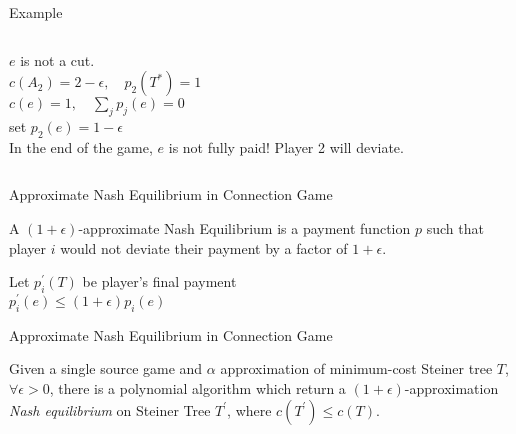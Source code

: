 \documentclass[11pt,aspectratio=169]{beamer}
\begin{document}
\begin{frame}{Example}
\begin{columns}
    \centering
\doublespacing
$e$ is not a cut.\\
$c(A_2) = 2-\epsilon,\quad p_2(T^*) =1$\\
$c(e) = 1,\quad \sum_{j}p_j(e) = 0 $\\
set $p_2(e) = 1 - \epsilon$ \\
In the end of the game, $e$ is not fully paid! Player 2 will deviate.
\end{columns}
\end{frame}

\begin{frame}{Approximate Nash Equilibrium in Connection Game}
    \begin{definition}
	    A \((1+\epsilon)\)-approximate Nash Equilibrium is a payment function \(p\) such that player \(i\) would not deviate their payment by a factor of \(1+\epsilon\).
    \end{definition}
    Let $ p_i^{'}(T)$ be player's final payment\\
   \centering
    $ p_i^{'}(e) \leq (1+\epsilon)p_i(e)$
\end{frame}

\begin{frame}{Approximate Nash Equilibrium in Connection Game}
    \begin{theorem}
        Given a single source game and \(\alpha\) approximation of minimum-cost Steiner tree \(T\), \(\forall \epsilon > 0\), there is a polynomial algorithm which return a \((1+\epsilon)\)-approximation \textit{Nash equilibrium} on Steiner Tree \(T^{'}\), where $c(T^{'}) \leq c(T)$.
    \end{theorem}
\end{frame}
\end{document}
